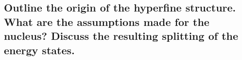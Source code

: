 \subsection{Outline the origin of the hyperfine structure. What are the assumptions made for the nucleus? Discuss the resulting splitting of the energy states.}


